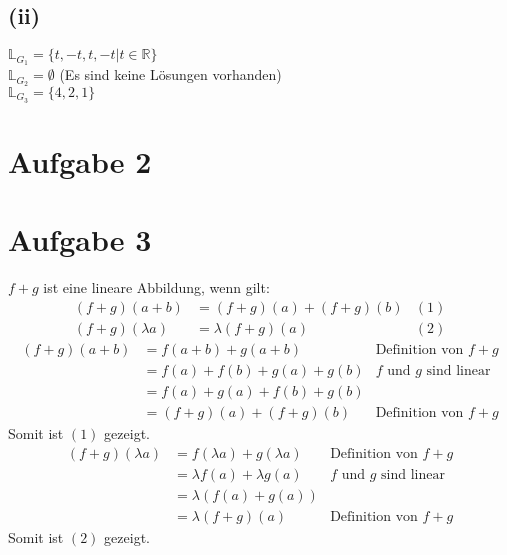 \documentclass{article}
\begin{document}
\subsection{(ii)}
$\mathbb{L}_{G_1} = \{t, -t, t, -t | t \in \mathbb{R}\}$ \\
$\mathbb{L}_{G_2} = \emptyset$ (Es sind keine Lösungen vorhanden) \\
$\mathbb{L}_{G_3} = \{4, 2, 1\}$
\section{Aufgabe 2}

\section{Aufgabe 3}
$f+g$ ist eine lineare Abbildung, wenn gilt:
\begin{align*}
    (f+g)(a+b) &= (f+g)(a)+(f+g)(b) & (1) \\
    (f+g)(\lambda a) &= \lambda(f+g)(a) & (2)
\end{align*}
\newline
\begin{align*}
    (f+g)(a+b) &= f(a+b)+g(a+b) &\text{Definition von $f+g$}\\
    &= f(a)+f(b) + g(a)+g(b) &\text{$f$ und $g$ sind linear}\\
    &= f(a)+g(a) + f(b) + g(b) \\
    &= (f+g)(a) + (f+g)(b) &\text{Definition von $f+g$}
\end{align*}
Somit ist $(1)$ gezeigt. \\
\newline
\begin{align*}
    (f+g)(\lambda a) &= f(\lambda a) + g(\lambda a) &\text{Definition von $f+g$} \\
    &= \lambda f(a) + \lambda g(a) & \text{$f$ und $g$ sind linear} \\
    &= \lambda(f(a)+g(a)) \\
    &= \lambda(f+g)(a) & \text{Definition von $f+g$}
\end{align*}
Somit ist $(2)$ gezeigt. \\
\end{document}
